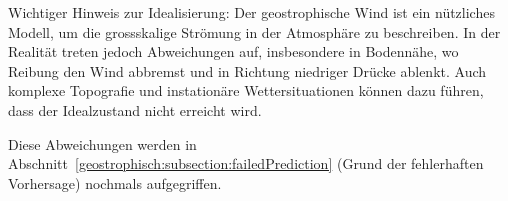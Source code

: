 Wichtiger Hinweis zur Idealisierung:
Der geostrophische Wind ist ein nützliches Modell, um die grossskalige Strömung in der Atmosphäre zu beschreiben. In der Realität treten jedoch Abweichungen auf, insbesondere in Bodennähe, wo Reibung den Wind abbremst und in Richtung niedriger Drücke ablenkt. Auch komplexe Topografie und instationäre Wettersituationen können dazu führen, dass der Idealzustand nicht erreicht wird.

Diese Abweichungen werden in Abschnitt~\ref{geostrophisch:subsection:failedPrediction} (Grund der fehlerhaften Vorhersage) nochmals aufgegriffen.







